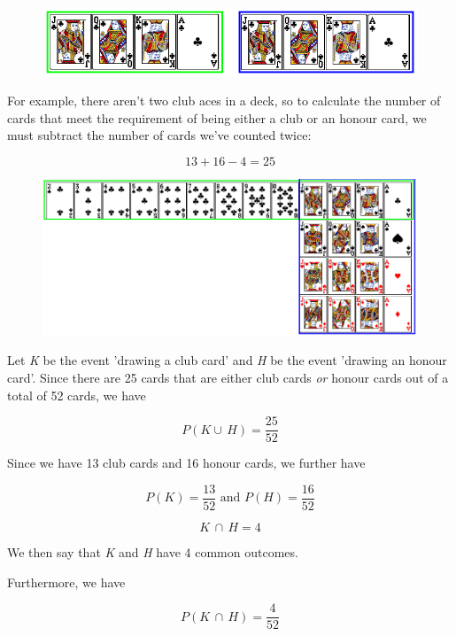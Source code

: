 \begin{figure}[H]
	\centering
	\includegraphics[scale=0.45]{kort4}
\end{figure}

For example, there aren't two club aces in a deck, so to calculate the number of cards that meet the requirement of being either a club or an honour card, we must subtract the number of cards we've counted twice:

$$ 13+16-4=25 $$

\begin{figure}[H]
	\centering
	\includegraphics[scale=0.45]{kort3}
\end{figure}

Let \textit{K} be the event 'drawing a club card' and \textit{H} be the event 'drawing an honour card'. Since there are 25 cards that are either club cards \textsl{or} honour cards out of a total of 52 cards, we have

$$P(K\cup\,H)=\frac{25}{52}$$

Since we have 13 club cards and 16 honour cards, we further have

$$P(K)=\frac{13}{52} \text{ and } P(H)=\frac{16}{52}$$

\qquad
{} \vs

\[ K\,\cap\,H=4 \]

We then say that \textit{K} and \textit{H} have 4 common outcomes.

Furthermore, we have

\[ P(K\,\cap\,H)=\frac{4}{52} \]

